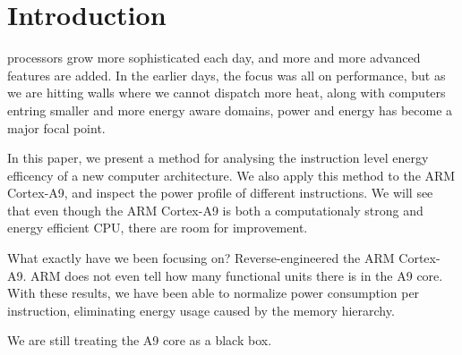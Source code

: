 \section{Introduction}

 processors grow more sophisticated each day, and
more and more advanced features are added. In the earlier days, the focus
was all on performance, but as we are hitting walls where we cannot dispatch
more heat, along with computers entring smaller and more energy aware domains,
power and energy has become a major focal point.

In this paper, we present a method for analysing the instruction level energy efficency
of a new computer architecture. We also apply this method to the ARM Cortex-A9, and
inspect the power profile of different instructions. We will see that even though
the ARM Cortex-A9 is both a computationaly strong and energy efficient CPU, there
are room for improvement.


What exactly have we been focusing on? Reverse-engineered the ARM Cortex-A9. ARM
does not even tell how many functional units there is in the A9 core. With these
results, we have been able to normalize power consumption per instruction,
eliminating energy usage caused by the memory hierarchy.

We are still treating the A9 core as a black box.
